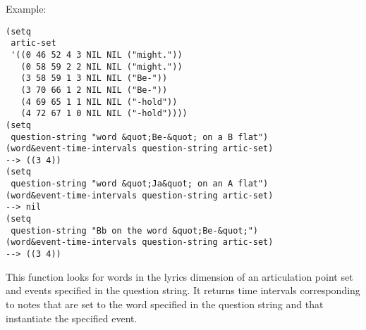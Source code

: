 \vspace{0.5cm}
\noindent Example:
\begin{verbatim}
(setq
 artic-set
 '((0 46 52 4 3 NIL NIL ("might."))
   (0 58 59 2 2 NIL NIL ("might."))
   (3 58 59 1 3 NIL NIL ("Be-"))
   (3 70 66 1 2 NIL NIL ("Be-"))
   (4 69 65 1 1 NIL NIL ("-hold"))
   (4 72 67 1 0 NIL NIL ("-hold"))))
(setq
 question-string "word &quot;Be-&quot; on a B flat")
(word&event-time-intervals question-string artic-set)
--> ((3 4))
(setq
 question-string "word &quot;Ja&quot; on an A flat")
(word&event-time-intervals question-string artic-set)
--> nil
(setq
 question-string "Bb on the word &quot;Be-&quot;")
(word&event-time-intervals question-string artic-set)
--> ((3 4))
\end{verbatim}

\noindent This function looks for words in the lyrics
dimension of an articulation point set and events
specified in the question string. It returns time
intervals corresponding to notes that are set to the
word specified in the question string and that
instantiate the specified event.













